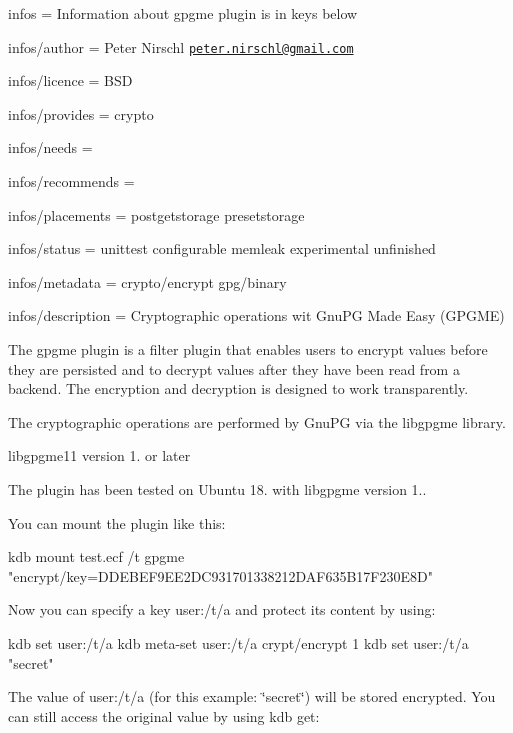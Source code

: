 
\begin{DoxyItemize}
\item infos = Information about gpgme plugin is in keys below
\item infos/author = Peter Nirschl \href{mailto:peter.nirschl@gmail.com}{\tt peter.\+nirschl@gmail.\+com}
\item infos/licence = B\+SD
\item infos/provides = crypto
\item infos/needs =
\item infos/recommends =
\item infos/placements = postgetstorage presetstorage
\item infos/status = unittest configurable memleak experimental unfinished
\item infos/metadata = crypto/encrypt gpg/binary
\item infos/description = Cryptographic operations wit Gnu\+PG Made Easy (G\+P\+G\+ME)
\end{DoxyItemize}

The {\ttfamily gpgme} plugin is a filter plugin that enables users to encrypt values before they are persisted and to decrypt values after they have been read from a backend. The encryption and decryption is designed to work transparently.

The cryptographic operations are performed by Gnu\+PG via the {\ttfamily libgpgme} library.


\begin{DoxyItemize}
\item {\ttfamily libgpgme11} version 1. or later
\end{DoxyItemize}

The plugin has been tested on Ubuntu 18. with {\ttfamily libgpgme} version 1..

You can mount the plugin like this\+:


\begin{DoxyCode}
kdb mount test.ecf /t gpgme "encrypt/key=DDEBEF9EE2DC931701338212DAF635B17F230E8D"
\end{DoxyCode}


Now you can specify a key {\ttfamily user\+:/t/a} and protect its content by using\+:


\begin{DoxyCode}
kdb set user:/t/a
kdb meta-set user:/t/a crypt/encrypt 1
kdb set user:/t/a "secret"
\end{DoxyCode}


The value of {\ttfamily user\+:/t/a} (for this example\+: \char`\"{}secret\char`\"{}) will be stored encrypted. You can still access the original value by using {\ttfamily kdb get}\+:


